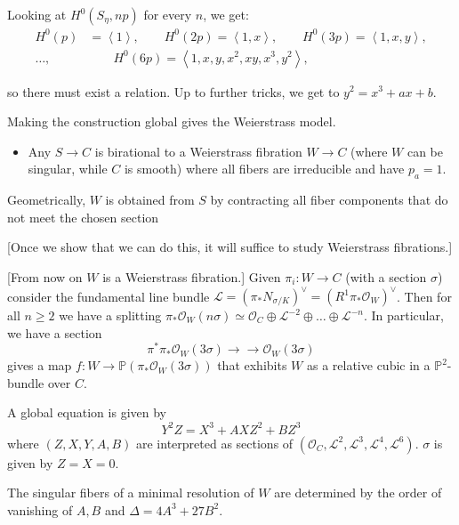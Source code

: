 Looking at $H^0(S_\eta,np)$
for every $n$, we get:
$$
\begin{aligned}
H^0(p)&=\left\langle{}1\right\rangle{},\qquad
H^0(2p)=\left\langle{}1,x\right\rangle{},
\qquad H^0(3p)=\left\langle{}1,x,y\right\rangle{},\\
…,&\qquad
H^0(6p)=\left\langle{}1,x,y,x^2,xy,x^3,y^2\right\rangle{},
\end{aligned}
$$

\noindent
so there must exist a relation.
Up to further tricks,
we get to $y^2=x^3+ax+b$.

Making the construction global
gives the Weierstrass model.

\begin{itemize}
\item Any $S \to C$ is birational to a
Weierstrass fibration $W \to C$
(where $W$ can be singular, while $C$ is
smooth)
where all fibers are irreducible and have
$p_a=1$.
\end{itemize}

\noindent
Geometrically, $W$ is obtained from $S$
by contracting all fiber components that
do not meet the chosen section

[Once we show that we can do this,
it will suffice to study Weierstrass
fibrations.]

[From now on $W$ is a Weierstrass fibration.]
Given $\pi_i:W \to C$ (with a section
$\sigma$)
consider the fundamental line bundle
$\mathcal{L}=(\pi_*N_{\sigma/K})^\vee=
(R^1\pi_*\mathcal{O}_W)^\vee$.
Then for all $n \geq 2$
we have a splitting
$\pi_*\mathcal{O}_{W}(n\sigma)\simeq
\mathcal{O}_C \oplus \mathcal{L}^{-2}
\oplus … \oplus \mathcal{L}^{-n}$.
In particular, we have a section
$$
\pi^*\pi_*\mathcal{O}_W(3\sigma)
\to\!\!\!\!\!\to\mathcal{O}
_W(3\sigma)
$$
gives a map $f:W \to
\mathbb{P}(\pi_*\mathcal{O}_W(3\sigma))$
that exhibits $W$ as a relative cubic in a
$\mathbb{P}^2$-bundle
over $C$.

A global equation is given by
$$
Y^2Z=X^3+AXZ^2+BZ^3
$$
where $(Z,X,Y,A,B)$ are interpreted
as sections of
$(\mathcal{O}_C,\mathcal{L}^2,\mathcal{L}^3,
\mathcal{L}^4,\mathcal{L}^6)$.
$\sigma$ is given by $Z=X=0$.

\begin{remark}
\label{remark-singular-fibers}
The singular fibers of a minimal resolution
of $W$
are determined by the order of vanishing of
$A,B$ and
$\Delta=4A^3+27B^2$.
\end{remark}

